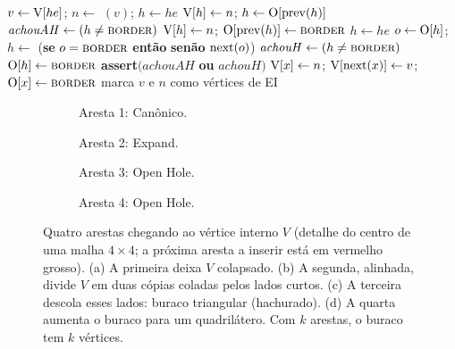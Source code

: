 \begin{algorithm}[ht]
\caption{$(he, x)$}
\label{alg:hole}
\begin{algorithmic}[1]
\State $v\gets\mathrm{V}[he]$; \quad $n\gets$ $(v)$; \quad $h\gets he$
\Repeat {}
  \State $\mathrm{V}[h]\gets n$; \quad $h\gets\mathrm{O}[\mathrm{prev}(h)]$
\State $\mathit{achouAH}\gets(h\ne\textsc{border})$
 $\mathrm{V}[h]\gets n$; \quad $\mathrm{O}[\mathrm{prev}(h)]\gets\textsc{border}$ 
\EndIf
\State $h\gets he$
\Repeat {}
  \State $o\gets\mathrm{O}[h]$; \quad $h\gets$ (\textbf{se} $o=\textsc{border}$ \textbf{então} \BORDER{} \textbf{senão} $\mathrm{next}(o)$)
\State $\mathit{achouH}\gets(h\ne\textsc{border})$
 $\mathrm{O}[h]\gets\textsc{border}$ 
\EndIf
\State \textbf{assert}$(\mathit{achouAH}$ \textbf{ou} $\mathit{achouH})$ 
\State $\mathrm{V}[x]\gets n$; \quad $\mathrm{V}[\mathrm{next}(x)]\gets v$; \quad $\mathrm{O}[x]\gets\textsc{border}$
\State marca $v$ e $n$ como vértices de EI
\end{algorithmic}
\end{algorithm}

\begin{figure}[ht]
\centering
\begin{subfigure}[b]{0.24\linewidth}\centering\resizebox{\linewidth}{!}{}\caption{Aresta 1: Canônico.}\end{subfigure}\hfill
\begin{subfigure}[b]{0.24\linewidth}\centering\resizebox{\linewidth}{!}{}\caption{Aresta 2: Expand.}\end{subfigure}\hfill
\begin{subfigure}[b]{0.24\linewidth}\centering\resizebox{\linewidth}{!}{}\caption{Aresta 3: Open Hole.}\end{subfigure}\hfill
\begin{subfigure}[b]{0.24\linewidth}\centering\resizebox{\linewidth}{!}{}\caption{Aresta 4: Open Hole.}\end{subfigure}
\caption{Quatro arestas chegando ao vértice interno $V$ (detalhe do centro de uma malha $4\times4$; a próxima aresta a
inserir está em vermelho grosso). (a) A primeira deixa $V$ colapsado. (b) A segunda, alinhada, divide $V$ em duas cópias
coladas pelos lados curtos. (c) A terceira descola esses lados: buraco triangular (hachurado). (d) A quarta aumenta o
buraco para um quadrilátero. Com $k$ arestas, o buraco tem $k$ vértices.}
\label{fig:hole}
\end{figure}

